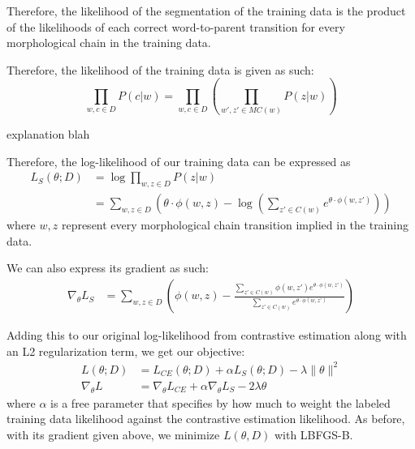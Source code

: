 \documentclass[11pt,twocolumn]{article}
\begin{document}
Therefore, the likelihood of the segmentation of the training data is the product of the likelihoods
of each correct word-to-parent transition for every morphological chain in the training data.

Therefore, the likelihood of the training data is given as such:
\begin{equation}
    \prod_{w, c \in D} P(c | w) = \prod_{w, c \in D}\left(\prod_{w', z' \in MC(w)} P(z | w)\right)
\end{equation}

explanation blah

Therefore, the log-likelihood of our training data can be expressed as
\begin{equation}
    \begin{split}
        L_S(\theta; D) &= \log{\prod_{w, z \in D} P(z|w)} \\
                     &= \sum_{w, z \in D} \left(\theta \cdot \phi(w, z) - \log\left(\sum_{z' \in C(w)} e^{\theta \cdot \phi(w, z')} \right)\right)
\end{split}
\end{equation}
where $w, z$ represent every morphological chain transition implied in the training data.

We can also express its gradient as such:
\begin{equation}
    \begin{split}
        \nabla_\theta L_S &= \sum_{w, z \in D} \left(\phi(w, z) - \frac{\sum_{z' \in C(w)} \phi(w, z') e^{\theta \cdot \phi(w, z')} }{\sum_{z' \in C(w)} e^{\theta \cdot \phi(w, z')}}\right)
    \end{split}
\end{equation}

Adding this to our original log-likelihood from contrastive estimation
along with an L2 regularization term, we get our objective:
\begin{equation}
    \begin{split}
        L(\theta; D) &= L_{CE}(\theta; D) + \alpha L_S(\theta; D) - \lambda \| \theta \|^2 \\
        \nabla_\theta L &= \nabla_\theta L_{CE} + \alpha \nabla_\theta L_S - 2\lambda \theta
    \end{split}
\end{equation}
where $\alpha$ is a free parameter that specifies by how much to weight the labeled training data likelihood
against the contrastive estimation likelihood.
As before, with its gradient given above, we minimize $L(\theta, D)$ with LBFGS-B.
\end{document}
